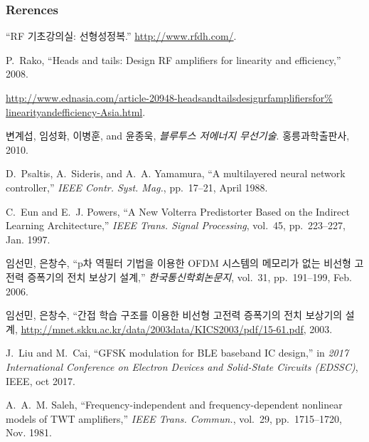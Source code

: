 \documentclass{beamer}
\begin{document}
\begin{frame}
\frametitle{Rerences}

\begin{thebibliography}{10}
\tiny

``{RF 기초강의실: 선형성정복}.''
\url{http://www.rfdh.com/}.

P.~Rako, ``{Heads and tails: Design RF amplifiers for linearity and
  efficiency},'' 2008.

  \url{http://www.ednasia.com/article-20948-headsandtailsdesignrfamplifiersfor%
linearityandefficiency-Asia.html}.

변계섭, 임성화, 이병훈, and 윤종욱, {\em 블루투스 저에너지
  무선기술}. 홍릉과학출판사, 2010.

D.~Psaltis, A.~Sideris, and A.~A. Yamamura, ``{A multilayered neural network
  controller},'' {\em IEEE Contr. Syst. Mag.}, pp.~17--21, April 1988.

C.~Eun and E.~J. Powers, ``{A New Volterra Predistorter Based on the Indirect
  Learning Architecture},'' {\em IEEE Trans. Signal Processing}, vol.~45,
  pp.~223--227, Jan. 1997.

임선민, 은창수, ``{p차 역필터 기법을 이용한 OFDM
  시스템의 메모리가 없는 비선형 고전력 증폭기의 전치
  보상기 설계},'' {\em 한국통신학회논문지}, vol.~31,
  pp.~191--199, Feb. 2006.

임선민, 은창수, ``{간접 학습 구조를 이용한 비선형
  고전력 증폭기의 전치 보상기의 설계},
 \url{http://mnet.skku.ac.kr/data/2003data/KICS2003/pdf/15-61.pdf}, 2003.

J.~Liu and M.~Cai, ``{GFSK} modulation for {BLE} baseband {IC} design,'' in
  {\em 2017 International Conference on Electron Devices and Solid-State
  Circuits ({EDSSC})}, {IEEE}, oct 2017.

A.~A.~M. Saleh, ``{Frequency-independent and frequency-dependent nonlinear
  models of TWT amplifiers},'' {\em {IEEE} Trans. Commun.}, vol.~29,
  pp.~1715--1720, Nov. 1981.


\end{thebibliography}  

\end{frame}
\end{document}
